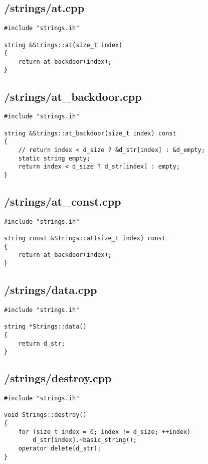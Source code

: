 \documentclass{article}
\begin{document}
\subsection*{/strings/at.cpp}
\begin{verbatim}
#include "strings.ih"

string &Strings::at(size_t index)
{
    return at_backdoor(index);
}
\end{verbatim}
\subsection*{/strings/at\_backdoor.cpp}
\begin{verbatim}
#include "strings.ih"

string &Strings::at_backdoor(size_t index) const
{
    // return index < d_size ? &d_str[index] : &d_empty;
    static string empty;
    return index < d_size ? d_str[index] : empty; 
}

\end{verbatim}
\subsection*{/strings/at\_const.cpp}
\begin{verbatim}
#include "strings.ih"

string const &Strings::at(size_t index) const
{
    return at_backdoor(index);
}
\end{verbatim}
\subsection*{/strings/data.cpp}
\begin{verbatim}
#include "strings.ih"

string *Strings::data()
{
    return d_str;
}
\end{verbatim}
\subsection*{/strings/destroy.cpp}
\begin{verbatim}
#include "strings.ih"

void Strings::destroy()
{
    for (size_t index = 0; index != d_size; ++index)
        d_str[index].~basic_string();
    operator delete(d_str);
}
\end{verbatim}
\end{document}

